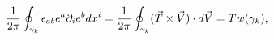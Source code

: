 \begin{equation}
\frac 1{2\pi }\oint_{\gamma _k}\epsilon _{ab}e^a\partial _ie^bdx^i=\frac 1{%
2\pi }\oint_{\gamma _k}(\vec{T}\times \vec{V})\cdot d\vec{V}=Tw(\gamma _k),
\label{twnum}
\end{equation}

